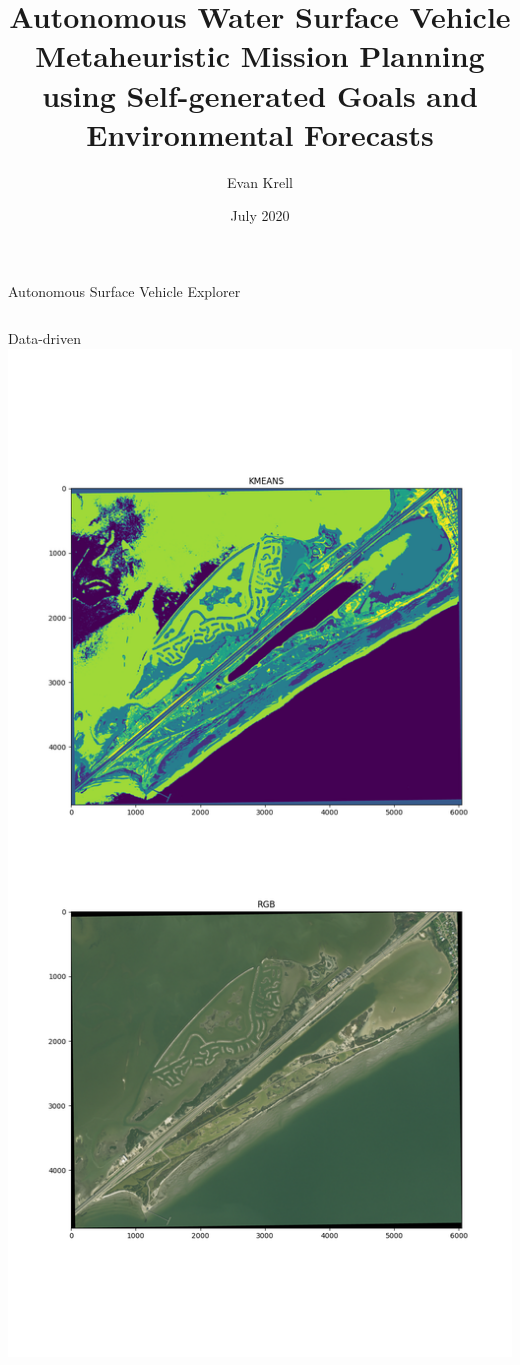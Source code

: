 \documentclass[9pt,xcolor=table]{beamer}
\title[y]{Autonomous Water Surface Vehicle \\ Metaheuristic Mission Planning \\ using Self-generated Goals and Environmental Forecasts}
\author{Evan Krell}
\date{July 2020}
\institute{Texas A\&M University - Corpus Christi}
\begin{document}
\beamertemplatenavigationsymbolsempty

\begin{frame}
  \titlepage
\end{frame}


\begin{frame}{Autonomous Surface Vehicle Explorer}
    \begin{columns}
        \begin{column}{0.33\textwidth}
            \begin{block}{Data-driven}
            \vspace{.25cm}
                \includegraphics[width=\textwidth,trim={0cm 26cm 0cm 8cm},clip]{img/clusters.png}

\end{block}
\end{column}
\end{columns}
\end{frame}
\end{document}
